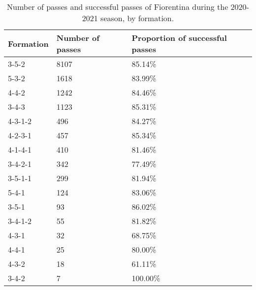 \begin{table}[!htbp]
\centering
\caption{Number of passes and successful passes of Fiorentina during the 2020-2021 season,
by formation.}
\begin{tabular}{@{}lll@{}}
\toprule
Formation & Number of passes & Proportion of successful passes  \\ \midrule
3-5-2          & 8107        & 85.14\%  \\
5-3-2          & 1618        & 83.99\%  \\
4-4-2          & 1242        & 84.46\%  \\
3-4-3          & 1123        & 85.31\%  \\
4-3-1-2        & 496         & 84.27\%  \\
4-2-3-1        & 457         & 85.34\%  \\
4-1-4-1        & 410         & 81.46\%  \\
3-4-2-1        & 342         & 77.49\%  \\
3-5-1-1        & 299         & 81.94\%  \\
5-4-1          & 124         & 83.06\%  \\
3-5-1          & 93          & 86.02\%  \\
3-4-1-2        & 55          & 81.82\%  \\
4-3-1          & 32          & 68.75\%  \\
4-4-1          & 25          & 80.00\%  \\
4-3-2          & 18          & 61.11\%  \\
3-4-2          & 7           & 100.00\% \\ \bottomrule
\end{tabular}

\label{tab:formation_Fiorentina}
\end{table}